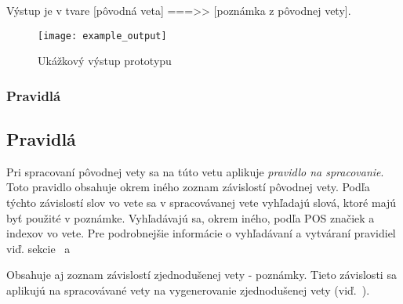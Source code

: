 Výstup je v tvare [pôvodná veta] ===>> [poznámka z pôvodnej vety].

\begin{figure}[H]
	\begin{center}\texttt{[image: example\_output]}\end{center}
	\caption[Ukážkový výstup prototypu]{Ukážkový výstup prototypu}\label{fig:example_output}
\end{figure}

%
%
{
	\subsubsection{Pravidlá}
}
{
	\subsection{Pravidlá}
}
\label{subsubsec:notenizer_pravidla}
Pri spracovaní pôvodnej vety sa na túto vetu aplikuje \textit{pravidlo na spracovanie}. Toto pravidlo obsahuje okrem iného zoznam závislostí pôvodnej vety. Podľa týchto závislostí slov vo vete sa v spracovávanej vete vyhľadajú slová, ktoré majú byť použité v poznámke. Vyhľadávajú sa, okrem iného, podľa POS značiek a indexov vo vete. Pre podrobnejšie informácie o vyhľadávaní a vytváraní pravidiel viď. sekcie~ a~

Obsahuje aj zoznam závislostí zjednodušenej vety - poznámky. Tieto závislosti sa aplikujú na spracovávané vety na vygenerovanie zjednodušenej vety (viď.~).